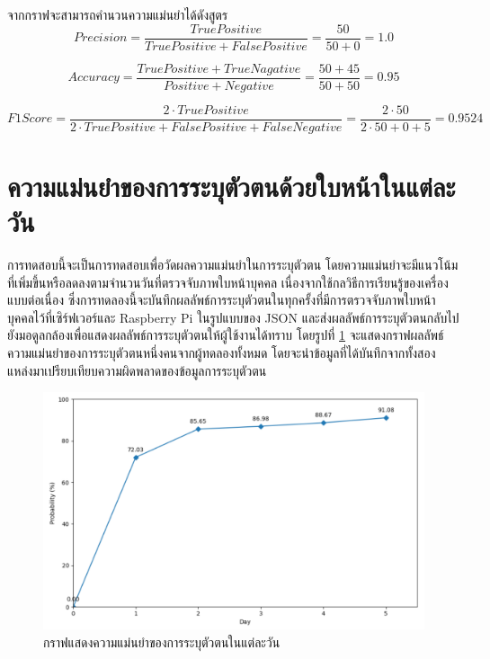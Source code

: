 \indent จากกราฟจะสามารถคำนวนความแม่นยำได้ดังสูตร 
\begin{equation}\label{eq:Precision}
Precision=\frac{True Positive}{True Positive + False Positive}=\frac{50}{50+0} = 1.0
\end{equation}

\begin{equation}\label{eq:Accuracy}
Accuracy=\frac{True Positive + True Nagative}{Positive + Negative}=\frac{50+45}{50+50} = 0.95
\end{equation}

\begin{equation}\label{eq:F1Score}
F1 Score=\frac{2\cdot True Positive}{2\cdot True Positive + False Positive + False Negative}=\frac{2\cdot 50}{2\cdot 50+0+5} = 0.9524
\end{equation}

\section{ความแม่นยำของการระบุตัวตนด้วยใบหน้าในแต่ละวัน}
การทดสอบนี้จะเป็นการทดสอบเพื่อวัดผลความแม่นยำในการระบุตัวตน โดยความแม่นยำจะมีแนวโน้มที่เพิ่มขึ้นหรือลดลงตามจำนวนวันที่ตรวจจับภาพใบหน้าบุคคล
เนื่องจากใช้กลวิธีการเรียนรู้ของเครื่องแบบต่อเนื่อง ซึ่งการทดลองนี้จะบันทึกผลลัพธ์การระบุตัวตนในทุกครั้งที่มีการตรวจจับภาพใบหน้าบุคคลไว้ที่เซิร์ฟเวอร์และ Raspberry Pi 
ในรูปแบบของ JSON และส่งผลลัพธ์การระบุตัวตนกลับไปยังมอดูลกล้องเพื่อแสดงผลลัพธ์การระบุตัวตนให้ผู้ใช้งานได้ทราบ 
โดยรูปที่ \ref*{fig:face_graph} จะแสดงกราฟผลลัพธ์ความแม่นยำของการระบุตัวตนหนึ่งคนจากผู้ทดลองทั้งหมด 
โดยจะนำข้อมูลที่ได้บันทึกจากทั้งสองแหล่งมาเปรียบเทียบความผิดพลาดของข้อมูลการระบุตัวตน

\begin{figure}[!ht]
    \begin{center}
      \includegraphics[scale=.5]{pic/Note_percent.png}
      \caption[กราฟแสดงความแม่นยำของการระบุตัวตนในแต่ละวัน]{กราฟแสดงความแม่นยำของการระบุตัวตนในแต่ละวัน}
      \label{fig:face_graph}
    \end{center}
  \end{figure}

